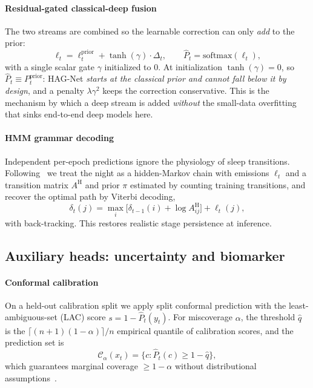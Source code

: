 \documentclass[journal]{IEEEtran}
\begin{document}
\paragraph{Residual-gated classical-deep fusion}
The two streams are combined so the learnable correction can only \emph{add} to the
prior:
\begin{equation}
\label{eq:fusion}
\ell_t = \ell^{\mathrm{prior}}_t + \tanh(\gamma)\cdot\Delta_t,
\qquad \hat P_t=\mathrm{softmax}(\ell_t),
\end{equation}
with a single scalar gate $\gamma$ initialized to $0$. At initialization
$\tanh(\gamma)=0$, so $\hat P_t\equiv P^{\mathrm{prior}}_t$: HAG-Net \emph{starts at
the classical prior and cannot fall below it by design}, and a penalty
$\lambda\gamma^2$ keeps the correction conservative. This is the mechanism by which
a deep stream is added \emph{without} the small-data overfitting that sinks
end-to-end deep models here.

\paragraph{HMM grammar decoding}
Independent per-epoch predictions ignore the physiology of sleep transitions.
Following~\cite{chen2024hmm} we treat the night as a hidden-Markov chain with
emissions $\ell_t$ and a transition matrix $A^{\mathrm{H}}$ and prior $\pi$
estimated by counting training transitions, and recover the optimal path by Viterbi
decoding,
\begin{equation}
\delta_t(j)=\max_i\big[\delta_{t-1}(i)+\log A^{\mathrm{H}}_{ij}\big]+\ell_t(j),
\end{equation}
with back-tracking. This restores realistic stage persistence at inference.

\subsection{Auxiliary heads: uncertainty and biomarker}
\paragraph{Conformal calibration}
On a held-out calibration split we apply split conformal prediction with the
least-ambiguous-set (LAC) score $s=1-\hat P_t(y_t)$. For miscoverage $\alpha$, the
threshold $\hat q$ is the $\lceil(n{+}1)(1{-}\alpha)\rceil/n$ empirical quantile of
calibration scores, and the prediction set is
\begin{equation}
\mathcal{C}_\alpha(x_t)=\{c:\hat P_t(c)\ge 1-\hat q\},
\end{equation}
which guarantees marginal coverage $\ge 1-\alpha$ without distributional
assumptions~\cite{angelopoulos2023conformal}.
\end{document}
